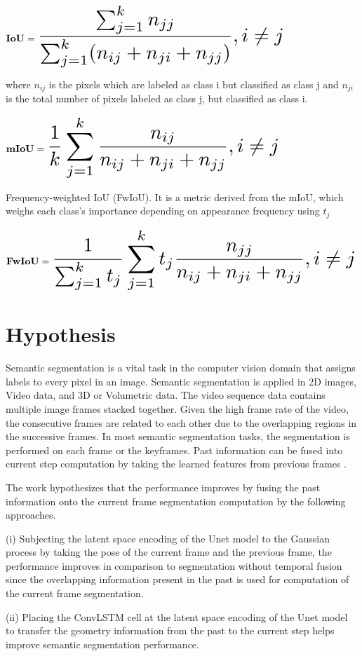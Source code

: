 	$
	{\bf IoU} = \scalemath{2}{\frac{\sum_{j=1}^{k} n_{jj}}{\sum_{j=1}^{k} (n_{ij}+n_{ji}+n_{jj})}, i \neq j }
	$

	where $ n_{ij}$ is the pixels which are labeled as class i but classified as class j and $n_{ji}$ is the total number of pixels labeled as class j, but classified as class i. \cite{84_ulku2022survey}
	
	$
	{\bf mIoU} = \scalemath{2}{\frac{1}{k} \sum_{j=1}^k \frac{n_{ij}}{n_{ij}+n_{ji}+n_{jj}},  i \neq j }
	$
	
	Frequency-weighted IoU (FwIoU). It is a metric derived from the mIoU, which weighs each class's importance depending on appearance frequency using $t_j$ \cite{84_ulku2022survey}
	
	$
	{\bf FwIoU} = \scalemath{2} {\frac{1}{\sum_{j=1}^k t_j} \sum_{j=1}^{k} t_j \frac{n_{jj}}{n_{ij}+n_{ji}+n_{jj}}, i \neq j }
	$
    
    \section{Hypothesis}
    
    Semantic segmentation is a vital task in the computer vision domain that assigns labels to every pixel in an image. Semantic segmentation is applied in 2D images, Video data, and 3D or Volumetric data. The video sequence data contains multiple image frames stacked together. Given the high frame rate of the video, the consecutive frames are related to each other due to the overlapping regions in the successive frames. In most semantic segmentation tasks, the segmentation is performed on each frame or the keyframes. Past information can be fused into current step computation by taking the learned features from previous frames \cite{78_hu2020temporally}.
    
    The work hypothesizes that the performance improves by fusing the past information onto the current frame segmentation computation by the following approaches.
    
    (i) Subjecting the latent space encoding of the Unet model to the Gaussian process by taking the pose of the current frame and the previous frame, the performance improves in comparison to segmentation without temporal fusion since the overlapping information present in the past is used for computation of the current frame segmentation.
    
    (ii) Placing the ConvLSTM cell at the latent space encoding of the Unet model to transfer the geometry information from the past to the current step helps improve semantic segmentation performance. 
    

